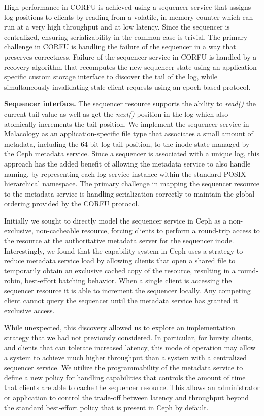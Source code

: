 \documentclass[preprint]{sigplanconf-eurosys}
\begin{document}
High-performance in CORFU is achieved using a sequencer service that assigns
log positions to clients by reading from a volatile, in-memory counter which
can run at a very high throughput and at low latency. Since the sequencer
is centralized, ensuring serializability in the common case is trivial.  The
primary challenge in CORFU is handling the failure of the sequencer in a way
that preserves correctness. Failure of the sequencer service in CORFU is
handled by a recovery algorithm that recomputes the new sequencer state using
an application-specific custom storage interface to discover the tail of the
log, while simultaneously invalidating stale client requests using an
epoch-based protocol.

{\bf Sequencer interface.} The sequencer resource supports the ability to
\emph{read()} the current tail value as well as get the \emph{next()} position in
the log which also atomically increments the tail position.
We implement the sequencer service in Malacology as an application-specific
file type that associates a small amount of metadata, including the 64-bit log
tail position, to the inode state managed by the Ceph metadata service. Since
a sequencer is associated with a unique log, this approach has the added
benefit of allowing the metadata service to also handle naming, by
representing each log service instance within the standard POSIX hierarchical
namespace. The primary challenge in mapping the sequencer resource to the
metadata service is handling serialization correctly to maintain the global
ordering provided by the CORFU protocol.

Initially we sought to directly model the sequencer service in Ceph as a
non-exclusive, non-cacheable resource, forcing clients to perform a round-trip
access to the resource at the authoritative metadata server for the sequencer
inode.  Interestingly, we found that the capability system in Ceph uses a
strategy to reduce metadata service load by allowing clients that open a
shared file to temporarily obtain an exclusive cached copy of the resource,
resulting in a round-robin, best-effort batching behavior. When a single
client is accessing the sequencer resource it is able to increment the
sequencer locally. Any competing client cannot query the sequencer until the
metadata service has granted it exclusive access.

While unexpected, this discovery allowed us to explore an implementation
strategy that we had not previously considered. In particular, for bursty
clients, and clients that can tolerate increased latency, this mode of operation may
allow a system to achieve much higher throughput than a system with a
centralized sequencer service.
We utilize the programmability of the metadata service to define a new policy
for handling capabilities that controls the amount of time that clients are
able to cache the sequencer resource. This allows an administrator or
application to control the trade-off between latency and throughput beyond the
standard best-effort policy that is present in Ceph by default. 
\end{document}
